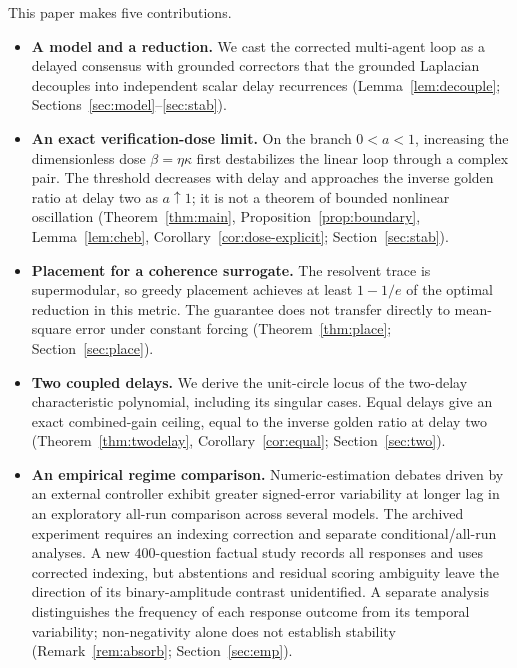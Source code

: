 \documentclass[11pt]{article}
\theoremstyle{definition}
\begin{document}
\noindent This paper makes five contributions.
\begin{itemize}
  \item \textbf{A model and a reduction.} We cast the corrected multi-agent loop as a delayed consensus
        with grounded correctors that the grounded Laplacian decouples into independent scalar delay
        recurrences (Lemma~\ref{lem:decouple}; Sections~\ref{sec:model}--\ref{sec:stab}).
  \item \textbf{An exact verification-dose limit.} On the branch $0<a<1$, increasing the
        dimensionless dose $\beta=\eta\kappa$ first destabilizes the linear loop through a complex
        pair. The threshold decreases with delay and approaches the inverse golden ratio at
        delay two as $a\uparrow1$; it is not a theorem of bounded nonlinear oscillation (Theorem~\ref{thm:main},
        Proposition~\ref{prop:boundary}, Lemma~\ref{lem:cheb}, Corollary~\ref{cor:dose-explicit};
        Section~\ref{sec:stab}).
  \item \textbf{Placement for a coherence surrogate.} The resolvent trace is supermodular, so greedy
        placement achieves at least $1-1/e$ of the optimal reduction in this metric. The guarantee
        does not transfer directly to mean-square error under constant forcing (Theorem~\ref{thm:place};
        Section~\ref{sec:place}).
  \item \textbf{Two coupled delays.} We derive the unit-circle locus of the two-delay characteristic
        polynomial, including its singular cases. Equal delays give an exact combined-gain ceiling,
        equal to the inverse golden ratio at delay two (Theorem~\ref{thm:twodelay}, Corollary~\ref{cor:equal};
        Section~\ref{sec:two}).
  \item \textbf{An empirical regime comparison.} Numeric-estimation debates driven by an external
        controller exhibit greater signed-error variability at longer lag in an exploratory
        all-run comparison across several models. The archived experiment requires an indexing
        correction and separate conditional/all-run analyses. A new $400$-question factual study
        records all responses and uses corrected indexing, but abstentions and residual scoring
        ambiguity leave the direction of its binary-amplitude contrast unidentified. A separate
        analysis distinguishes the frequency of each response outcome from its temporal variability;
        non-negativity alone does not establish stability
        (Remark~\ref{rem:absorb}; Section~\ref{sec:emp}).
\end{itemize}
\end{document}
